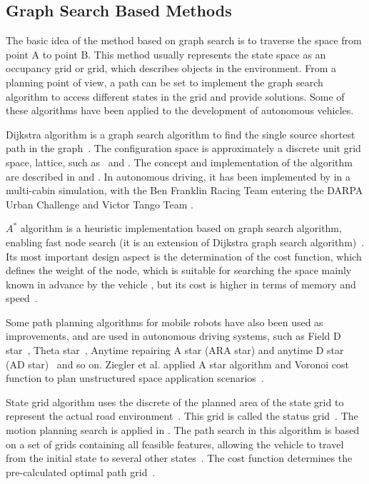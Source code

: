 \documentclass[conference]{IEEEtran}
\begin{document}
\subsection{Graph Search Based Methods}
The basic idea of the method based on graph search is to traverse the space from point A to point B. This method usually represents the state space as an occupancy grid or grid, which describes objects in the environment. From a planning point of view, a path can be set to implement the graph search algorithm to access different states in the grid and provide solutions.  Some of these algorithms have been applied to the development of autonomous vehicles.

Dijkstra algorithm is a graph search algorithm to find the single source shortest path in the graph~\cite{dijkstra1959note}. The configuration space is approximately a discrete unit grid space, lattice, such as~\cite{marchese2006multiple} and \cite{lavalle1998optimal}.  The concept and implementation of the algorithm are described in \cite{lavalle2006planning} and \cite{hwang2003fast}.  In autonomous driving, it has been implemented by \cite{kala2013multi} in a multi-cabin simulation, with the Ben Franklin Racing Team entering the DARPA Urban Challenge \cite{bohren2008little} and Victor Tango Team \cite{bacha2008odin}.

$A^*$ algorithm is a heuristic implementation based on graph search algorithm, enabling fast node search (it is an extension of Dijkstra graph search algorithm)~\cite{Hart1968formal}.  Its most important design aspect is the determination of the cost function, which defines the weight of the node, which is suitable for searching the space mainly known in advance by the vehicle \cite{likhachev2009planning}, but its cost is higher in terms of memory and speed~\cite{Hart1968formal}.

Some path planning algorithms for mobile robots have also been used as improvements, and are used in autonomous driving systems, such as Field D star~\cite{ferguson2006using}, Theta star~\cite{KAHANA2001739}, Anytime repairing A star (ARA star) and anytime D star (AD  star)~\cite{LIKHACHEV20081613} and so on.  Ziegler et al. applied A star algorithm and Voronoi cost function to plan unstructured space application scenarios~\cite{Ziegler2008}.

State grid algorithm uses the discrete of the planned area of the state grid to represent the actual road environment~\cite{self_driving}. This grid is called the status grid~\cite{Brian2016}. The motion planning search is applied in \cite{Pivtoraiko2005}. The path search in this algorithm is based on a set of grids containing all feasible features, allowing the vehicle to travel from the initial state to several other states~\cite{Pivtoraiko2005}. The cost function determines the pre-calculated optimal path grid~\cite{Pivtoraiko2005}.
\end{document}
